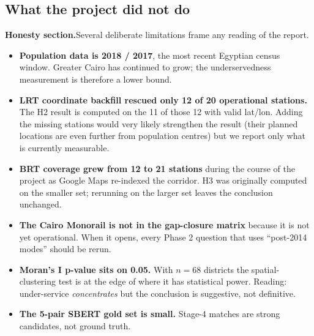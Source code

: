 
\subsection{What the project did not do}

\begin{warningbox}
\textbf{\color{plotorange}Honesty section.}\quad Several deliberate
limitations frame any reading of the report.

\begin{itemize}
 \item \textbf{Population data is 2018 / 2017}, the most recent
 Egyptian census window. Greater Cairo has continued to grow;
 the underservedness measurement is therefore a lower bound.
 \item \textbf{LRT coordinate backfill rescued only 12 of 20
 operational stations.} The H2 result is computed on the 11 of
 those 12 with valid lat/lon. Adding the missing stations would
 very likely strengthen the result (their planned locations are
 even further from population centres) but we report only what
 is currently measurable.
 \item \textbf{BRT coverage grew from 12 to 21 stations} during the
 course of the project as Google Maps re-indexed the corridor.
 H3 was originally computed on the smaller set; rerunning on
 the larger set leaves the conclusion unchanged.
 \item \textbf{The Cairo Monorail is not in the gap-closure matrix}
 because it is not yet operational. When it opens, every Phase
 2 question that uses ``post-2014 modes'' should be rerun.
 \item \textbf{Moran's I p-value sits on 0.05.} With $n = 68$ districts
 the spatial-clustering test is at the edge of where it has
 statistical power. Reading: under-service \emph{concentrates}
 but the conclusion is suggestive, not definitive.
 \item \textbf{The 5-pair SBERT gold set is small.} Stage-4 matches
 are strong candidates, not ground truth.
\end{itemize}
\end{warningbox}
